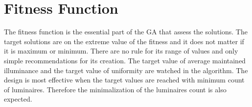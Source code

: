 \section{Fitness Function}
The fitness function is the essential part of the GA that assess the solutions. The target solutions are on the extreme value of the fitness and it does not matter if it is maximum or minimum. There are no rule for its range of values and only simple recommendations for its creation. The target value of average maintained illuminance and the target value of uniformity are watched in the algorithm. The design is most effective when the target values are reached with minimum count of luminaires. Therefore the minimalization of the luminaires count is also expected.
